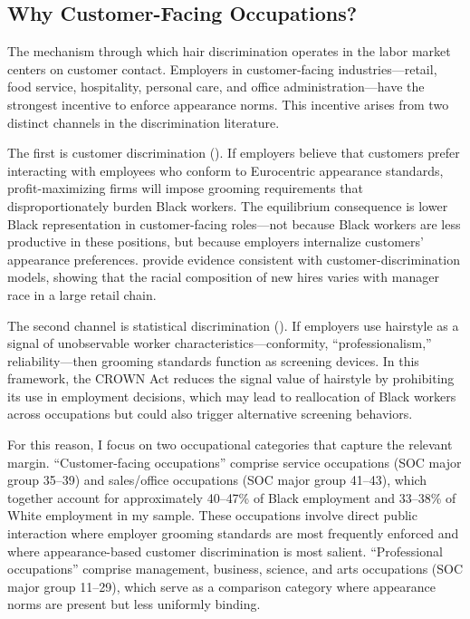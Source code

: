\documentclass[12pt]{article}
\begin{document}
\subsection{Why Customer-Facing Occupations?}

The mechanism through which hair discrimination operates in the labor market centers on customer contact. Employers in customer-facing industries---retail, food service, hospitality, personal care, and office administration---have the strongest incentive to enforce appearance norms. This incentive arises from two distinct channels in the discrimination literature.

The first is customer discrimination (\citealt{becker1957}). If employers believe that customers prefer interacting with employees who conform to Eurocentric appearance standards, profit-maximizing firms will impose grooming requirements that disproportionately burden Black workers. The equilibrium consequence is lower Black representation in customer-facing roles---not because Black workers are less productive in these positions, but because employers internalize customers' appearance preferences. \citet{giuliano2009} provide evidence consistent with customer-discrimination models, showing that the racial composition of new hires varies with manager race in a large retail chain.

The second channel is statistical discrimination (\citealt{phelps1972, arrow1973}). If employers use hairstyle as a signal of unobservable worker characteristics---conformity, ``professionalism,'' reliability---then grooming standards function as screening devices. In this framework, the CROWN Act reduces the signal value of hairstyle by prohibiting its use in employment decisions, which may lead to reallocation of Black workers across occupations but could also trigger alternative screening behaviors.

For this reason, I focus on two occupational categories that capture the relevant margin. ``Customer-facing occupations'' comprise service occupations (SOC major group 35--39) and sales/office occupations (SOC major group 41--43), which together account for approximately 40--47\% of Black employment and 33--38\% of White employment in my sample. These occupations involve direct public interaction where employer grooming standards are most frequently enforced and where appearance-based customer discrimination is most salient. ``Professional occupations'' comprise management, business, science, and arts occupations (SOC major group 11--29), which serve as a comparison category where appearance norms are present but less uniformly binding.
\end{document}
